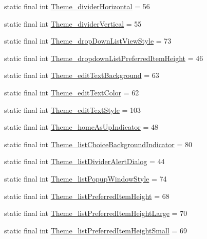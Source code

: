 \begin{DoxyCompactItemize}
\item 
static final int \hyperlink{classcheck_1_1test_1_1_r_1_1styleable_acd0c530f019a2431d54c833109966ffb}{Theme\+\_\+divider\+Horizontal} = 56
\item 
static final int \hyperlink{classcheck_1_1test_1_1_r_1_1styleable_a377c24517d2d2e1fec3897b381126055}{Theme\+\_\+divider\+Vertical} = 55
\item 
static final int \hyperlink{classcheck_1_1test_1_1_r_1_1styleable_ab53b97b9568cde83dc65605a14dab2f4}{Theme\+\_\+drop\+Down\+List\+View\+Style} = 73
\item 
static final int \hyperlink{classcheck_1_1test_1_1_r_1_1styleable_a4b8e66fe596de4f95de89a3fb97316d8}{Theme\+\_\+dropdown\+List\+Preferred\+Item\+Height} = 46
\item 
static final int \hyperlink{classcheck_1_1test_1_1_r_1_1styleable_ab28653ef2c423653f679a95b9eb7e7fa}{Theme\+\_\+edit\+Text\+Background} = 63
\item 
static final int \hyperlink{classcheck_1_1test_1_1_r_1_1styleable_ab8022b2bf8b784e17530f17a05186fa2}{Theme\+\_\+edit\+Text\+Color} = 62
\item 
static final int \hyperlink{classcheck_1_1test_1_1_r_1_1styleable_ac901bbf20d4b5142cbf9b03381ae438b}{Theme\+\_\+edit\+Text\+Style} = 103
\item 
static final int \hyperlink{classcheck_1_1test_1_1_r_1_1styleable_aae9299f409cd1528cb1b807fe0eecbb0}{Theme\+\_\+home\+As\+Up\+Indicator} = 48
\item 
static final int \hyperlink{classcheck_1_1test_1_1_r_1_1styleable_a26daf114808db4e2394c40f88131eb51}{Theme\+\_\+list\+Choice\+Background\+Indicator} = 80
\item 
static final int \hyperlink{classcheck_1_1test_1_1_r_1_1styleable_ab74d6b5271031da6a2f14e60706211e7}{Theme\+\_\+list\+Divider\+Alert\+Dialog} = 44
\item 
static final int \hyperlink{classcheck_1_1test_1_1_r_1_1styleable_a43cec80892caa72b4d7185ffbe3950f9}{Theme\+\_\+list\+Popup\+Window\+Style} = 74
\item 
static final int \hyperlink{classcheck_1_1test_1_1_r_1_1styleable_ab8d78a772c83aad6fa1b020d5f846f67}{Theme\+\_\+list\+Preferred\+Item\+Height} = 68
\item 
static final int \hyperlink{classcheck_1_1test_1_1_r_1_1styleable_a6b792de713c77b5d2897ffd143ea5d6a}{Theme\+\_\+list\+Preferred\+Item\+Height\+Large} = 70
\item 
static final int \hyperlink{classcheck_1_1test_1_1_r_1_1styleable_a59adeb7f43ab4c55c41858885f6d3085}{Theme\+\_\+list\+Preferred\+Item\+Height\+Small} = 69

\end{DoxyCompactItemize}
